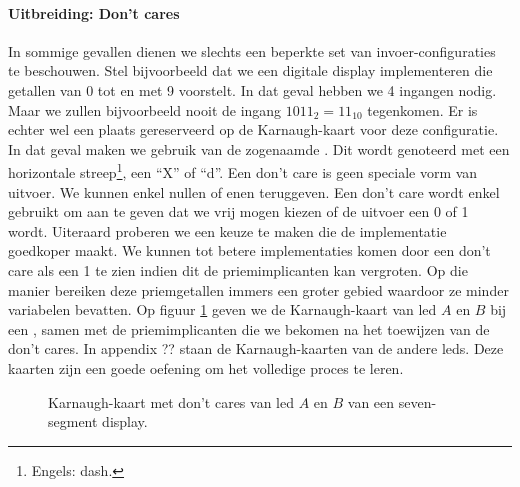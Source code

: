 \paragraph{Uitbreiding: Don't cares}
In sommige gevallen dienen we slechts een beperkte set van invoer-configuraties te beschouwen. Stel bijvoorbeeld dat we een digitale display implementeren die getallen van 0 tot en met 9 voorstelt. In dat geval hebben we 4 ingangen nodig. Maar we zullen bijvoorbeeld nooit de ingang $1011_2=11_{10}$ tegenkomen. Er is echter wel een plaats gereserveerd op de Karnaugh-kaart voor deze configuratie. In dat geval maken we gebruik van de zogenaamde . Dit wordt genoteerd met een horizontale streep\footnote{Engels: dash.}, een ``X'' of ``d''. Een don't care is geen speciale vorm van uitvoer. We kunnen enkel nullen of enen teruggeven. Een don't care wordt enkel gebruikt om aan te geven dat we vrij mogen kiezen of de uitvoer een 0 of 1 wordt. Uiteraard proberen we een keuze te maken die de implementatie goedkoper maakt. We kunnen tot betere implementaties komen door een don't care als een 1 te zien indien dit de priemimplicanten kan vergroten. Op die manier bereiken deze priemgetallen immers een groter gebied waardoor ze minder variabelen bevatten. Op figuur \ref{fig:sevenDigitDisplay} geven we de Karnaugh-kaart van led $A$ en $B$ bij een , samen met de priemimplicanten die we bekomen na het toewijzen van de don't cares. In appendix ?? staan de Karnaugh-kaarten van de andere leds. Deze kaarten zijn een goede oefening om het volledige proces te leren.
\begin{figure}[hbt]
\centering
{}
\caption{Karnaugh-kaart met don't cares van led $A$ en $B$ van een seven-segment display.}
\label{fig:sevenDigitDisplay}
\end{figure}

